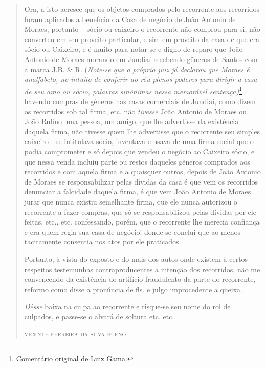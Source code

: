 \begin{quote}
Ora, a isto acresce que os objetos comprados pelo recorrente aos
recorridos foram aplicados a benefício da Casa de negócio de João
Antonio de Moraes, portanto -- sócio ou caixeiro o recorrente não
comprou para si, não converteu em seu proveito particular, e sim em
proveito da casa de que era sócio ou Caixeiro, e é muito para notar-se e
digno de reparo que João Antonio de Moraes morando em Jundiaí recebendo
gêneros de Santos com a marca J.B. \& R. (\emph{Note-se que o próprio
juiz já declarou que Moraes é analfabeto, no intuito de conferir ao réu
plenos poderes para dirigir a casa de seu amo ou sócio, palavras
sinônimas nessa memorável sentença)}\footnote{ Comentário original de
  Luiz Gama.} havendo compras de gêneros nas casas comerciais de
Jundiaí, como dizem os recorridos sob tal firma, etc. não \emph{tivesse}
João Antonio de Moraes ou João Rufino uma pessoa, um amigo, que lhe
advertisse da existência daquela firma, não tivesse quem lhe advertisse
que o recorrente seu simples caixeiro - se intitulava sócio, inventava e
usava de uma firma social que o podia comprometer e só depois que vendeu
o negócio ao Caixeiro sócio, e que nessa venda incluiu parte ou restos
daqueles gêneros comprados aos recorridos e com aquela firma e a
quaisquer outros, depois de João Antonio de Moraes se responsabilizar
pelas dívidas da casa é que vem os recorridos denunciar a falcidade
daquela firma, é que vem João Antonio de Moraes jurar que nunca existiu
semelhante firma, que ele nunca autorizou o recorrente a fazer compras,
que só se responsabilizou pelas dívidas por ele feitas, etc., etc.
confessando, porém, que o recorrente lhe merecia confiança e era quem
regia sua casa de negócio! donde se conclui que ao menos tacitamente
consentia nos atos por ele praticados.

Portanto, à vista do exposto e do mais dos autos onde existem à certos
respeitos testemunhas contraproducentes a intenção dos recorridos, não
me convencendo da existência do artifício fraudulento da parte do
recorrente, reformo como disse a pronúncia de fls. e julgo improcedente
a queixa.

\emph{Dêsse} baixa na culpa ao recorrente e risque-se seu nome do rol de
culpados, e passe-se o alvará de soltura etc. etc.

\begin{flushright}
\textsc{vicente ferreira da silva bueno}
\end{flushright}
\end{quote}

\asterisc{}

